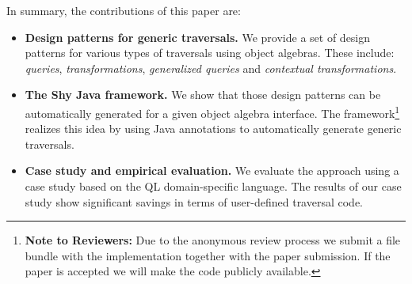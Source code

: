 In summary, the contributions of this paper are:

\begin{itemize}

\item {\bf Design patterns for generic traversals.} We provide a set of design
patterns for various types of traversals using object algebras. These include:
\emph{queries}, \emph{transformations},
\emph{generalized queries} and \emph{contextual transformations}.

\item {\bf The Shy Java framework.} We show that those design patterns
  can be automatically generated for a given object algebra
  interface. The \name framework\footnote{{\bf
      Note to Reviewers:} Due to the anonymous review process we
    submit a file bundle with the implementation together with the paper submission. If the
    paper is accepted we will make the code publicly available.} realizes this idea by using
   Java annotations to automatically generate generic traversals.

\item {\bf Case study and empirical evaluation.} We evaluate the
  approach using a case study based on the QL domain-specific
  language. The results of our case study show significant savings in
  terms of user-defined traversal code.
\end{itemize}
